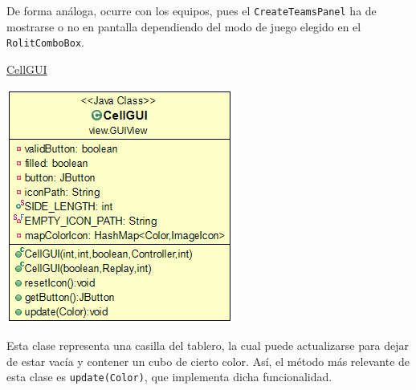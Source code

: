 \documentclass[12pt,a4paper,openright]{book}
\theoremstyle{break}
\begin{document}
De forma análoga, ocurre con los equipos, pues el \texttt{CreateTeamsPanel} ha de mostrarse o no en pantalla dependiendo del modo de juego elegido en el \texttt{RolitComboBox}.
\newpage

\underline{CellGUI}
\begin{center}
\includegraphics[scale=0.65]{cellgui.png}
\end{center}

Esta clase representa una casilla del tablero, la cual puede actualizarse para dejar de estar vacía y contener un cubo de cierto color. Así, el método más relevante de esta clase es \texttt{update(Color)}, que implementa dicha funcionalidad.
\end{document}
